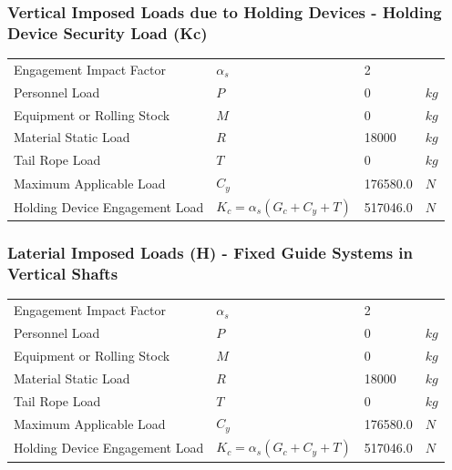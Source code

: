 \documentclass{article}%
\begin{document}
%
\subsubsection{Vertical Imposed Loads due to Holding Devices {-} Holding Device Security Load (Kc)}%
\label{ssubsec:VerticalImposedLoadsduetoHoldingDevices{-}HoldingDeviceSecurityLoad(Kc)}%
\begin{flushleft}%
\begin{minipage}{\textwidth}%
\flushleft%
\begin{tabular}{l l l l}%
Engagement Impact Factor&$\alpha_s$&2&\\%
Personnel Load&$P$&0&$kg$\\%
Equipment or Rolling Stock&$M$&0&$kg$\\%
Material Static Load&$R$&18000&$kg$\\%
Tail Rope Load&$T$&0&$kg$\\%
Maximum Applicable Load&$C_y$&176580.0&$N$\\%
Holding Device Engagement Load&$K_c = \alpha_s(G_c+C_y+T)$&517046.0&$N$\\%
\end{tabular}%
\end{minipage}%
\end{flushleft}

%
\subsubsection{Laterial Imposed Loads (H) {-} Fixed Guide Systems in Vertical Shafts}%
\label{ssubsec:LaterialImposedLoads(H){-}FixedGuideSystemsinVerticalShafts}%
\begin{flushleft}%
\begin{minipage}{\textwidth}%
\flushleft%
\begin{tabular}{l l l l}%
Engagement Impact Factor&$\alpha_s$&2&\\%
Personnel Load&$P$&0&$kg$\\%
Equipment or Rolling Stock&$M$&0&$kg$\\%
Material Static Load&$R$&18000&$kg$\\%
Tail Rope Load&$T$&0&$kg$\\%
Maximum Applicable Load&$C_y$&176580.0&$N$\\%
Holding Device Engagement Load&$K_c = \alpha_s(G_c+C_y+T)$&517046.0&$N$\\%
\end{tabular}%
\end{minipage}%
\end{flushleft}%
\end{document}
